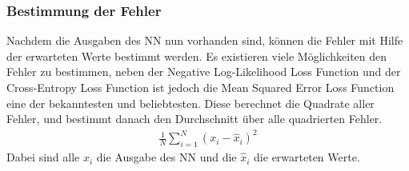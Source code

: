 \subsubsection{Bestimmung der Fehler}
Nachdem die Ausgaben des NN nun vorhanden sind, können die Fehler mit Hilfe der erwarteten Werte bestimmt werden. Es existieren viele Möglichkeiten den Fehler zu bestimmen, neben der Negative Log-Likelihood Loss Function und der Cross-Entropy Loss Function ist jedoch die Mean Squared Error Loss Function eine der bekanntesten und beliebtesten. Diese berechnet die Quadrate aller Fehler, und bestimmt danach den Durchschnitt über alle quadrierten Fehler.
\begin{align}
	\frac{1}{N}\sum_{i=1}^{N}(x_{i} - \hat{x}_{i})^2
	\label{MSE}
\end{align}
Dabei sind alle $x_{i}$ die Ausgabe des NN und die $\hat{x}_{i}$ die erwarteten Werte.


